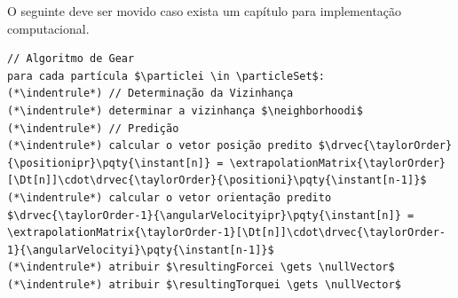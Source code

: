 \alert{O seguinte deve ser movido caso exista um capítulo para implementação computacional.}
\begin{lstlisting}[float, floatplacement=h, language=pseudocode, label=lst:equations_solution, caption=Pseudocódigo para a solução das equações de movimento de partículas esféricas por meio do algoritmo de Gear.]
// Algoritmo de Gear
para cada partícula $\particlei \in \particleSet$:
(*\indentrule*)	// Determinação da Vizinhança
(*\indentrule*)	determinar a vizinhança $\neighborhoodi$
(*\indentrule*)	// Predição
(*\indentrule*)	calcular o vetor posição predito $\drvec{\taylorOrder}{\positionipr}\pqty{\instant[n]} = \extrapolationMatrix{\taylorOrder}[\Dt[n]]\cdot\drvec{\taylorOrder}{\positioni}\pqty{\instant[n-1]}$
(*\indentrule*)	calcular o vetor orientação predito $\drvec{\taylorOrder-1}{\angularVelocityipr}\pqty{\instant[n]} = \extrapolationMatrix{\taylorOrder-1}[\Dt[n]]\cdot\drvec{\taylorOrder-1}{\angularVelocityi}\pqty{\instant[n-1]}$
(*\indentrule*)	atribuir $\resultingForcei \gets \nullVector$
(*\indentrule*)	atribuir $\resultingTorquei \gets \nullVector$


\end{lstlisting}
